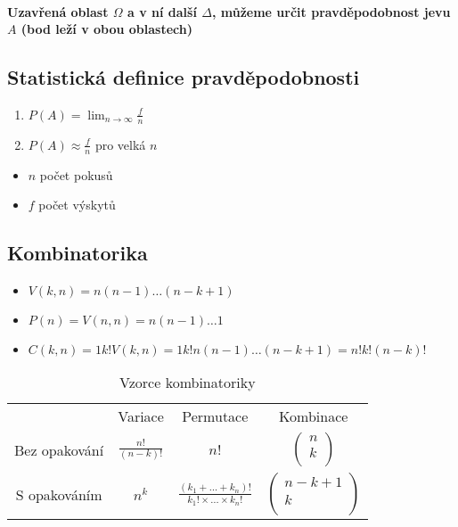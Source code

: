 \documentclass{article}
\begin{document}
\paragraph{Uzavřená oblast $\Omega$ a v ní další $\Delta$, můžeme určit pravděpodobnost jevu $A$ (bod leží v obou oblastech)}

\subsection{Statistická definice pravděpodobnosti}
\begin{enumerate}
    \item $P\left(A\right)=\lim_{n\to\infty} \frac{f}{n}$
    \item $P\left(A\right)\approx\frac{f}{n}$ pro velká $n$
\end{enumerate}

\begin{itemize}
    \item $n$ počet pokusů
    \item $f$ počet výskytů
\end{itemize}

\subsection{Kombinatorika}
\begin{itemize}
    \item $V\left(k,n\right)=n\left(n-1\right)\ldots\left(n-k+1\right)$
    \item $P\left(n\right) =V\left(n,n\right) =n\left(n-1\right)\ldots1$
    \item $C(k,n)=1k!V(k,n)=1k!n(n-1)\ldots(n-k+1)=n!k!(n-k)!$
\end{itemize}

\begin{table}[h]
    \centering
    \begin{tabular}{c c c c}
         & Variace & Permutace & Kombinace \\
        Bez opakování & $\frac{n!}{(n-k)!}$ & $n!$ &
        $\begin{pmatrix}
            n \\
            k \\
        \end{pmatrix}$\\
        S opakováním & $n^k$ & $\frac{(k_1+\ldots+k_n)!}{k_1!\times\ldots\times k_n!}$ & $\begin{pmatrix}
            n-k+1 \\
            k \\
        \end{pmatrix}$ \\
    \end{tabular}
    \caption{Vzorce kombinatoriky}
    \label{tab:komb}
\end{table}
\end{document}
